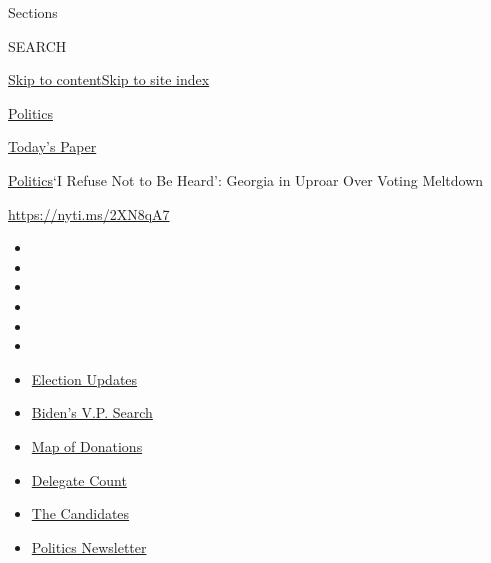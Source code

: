 Sections

SEARCH

\protect\hyperlink{site-content}{Skip to
content}\protect\hyperlink{site-index}{Skip to site index}

\href{https://www.nytimes3xbfgragh.onion/section/politics}{Politics}

\href{https://myaccount.nytimes3xbfgragh.onion/auth/login?response_type=cookie\&client_id=vi}{}

\href{https://www.nytimes3xbfgragh.onion/section/todayspaper}{Today's
Paper}

\href{/section/politics}{Politics}\textbar{}`I Refuse Not to Be Heard':
Georgia in Uproar Over Voting Meltdown

\url{https://nyti.ms/2XN8qA7}

\begin{itemize}
\item
\item
\item
\item
\item
\item
\end{itemize}

\begin{itemize}
\item
  \href{https://www.nytimes3xbfgragh.onion/2020/08/04/us/elections/primary-election-michigan-arizona-kansas.html?action=click\&pgtype=Article\&state=default\&region=TOP_BANNER\&context=storylines_menu}{Election
  Updates}
\item
  \href{https://www.nytimes3xbfgragh.onion/article/biden-vice-president-2020.html?action=click\&pgtype=Article\&state=default\&region=TOP_BANNER\&context=storylines_menu}{Biden's
  V.P. Search}
\item
  \href{https://www.nytimes3xbfgragh.onion/interactive/2020/07/24/us/politics/trump-biden-campaign-donors.html?action=click\&pgtype=Article\&state=default\&region=TOP_BANNER\&context=storylines_menu}{Map
  of Donations}
\item
  \href{https://www.nytimes3xbfgragh.onion/interactive/2020/us/elections/delegate-count-primary-results.html?action=click\&pgtype=Article\&state=default\&region=TOP_BANNER\&context=storylines_menu}{Delegate
  Count}
\item
  \href{https://www.nytimes3xbfgragh.onion/interactive/2019/us/politics/2020-presidential-candidates.html?action=click\&pgtype=Article\&state=default\&region=TOP_BANNER\&context=storylines_menu}{The
  Candidates}
\item
  \href{https://www.nytimes3xbfgragh.onion/newsletters/politics?action=click\&pgtype=Article\&state=default\&region=TOP_BANNER\&context=storylines_menu}{Politics
  Newsletter}
\end{itemize}

